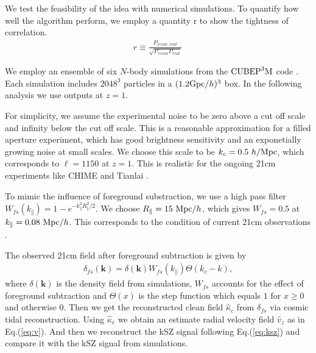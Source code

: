 We test the feasibility of the idea with numerical 
simulations. 
To quantify how well the algorithm perform, we employ a quantity r to show the tightness of correlation.
\begin{eqnarray}
	r\equiv \frac{P_{recon,real}}{\sqrt{P_{recon}P_{real}}}\,
\end{eqnarray}

We employ an ensemble of six $N$-body simulations from the
$\mathrm{CUBEP}^3\mathrm{M}$ code \cite{2013:code}. 
Each simulation includes $2048^3$ particles in a $(1.2\mathrm{Gpc}/h)^3$ box. 
In the following analysis we use outputs at $z=1$.

For simplicity, we assume the experimental
noise to be zero above a cut off scale and infinity below the cut off scale.
This is a reasonable approximation for a filled aperture experiment, which
has good brightness sensitivity and an exponetially growing noise at small 
scales.
We choose this scale to be $k_c=0.5\ h/\mr{Mpc}$, which corresponds
to $\ell=1150$ at $z=1$. This is realistic for the ongoing 21cm experiments like
CHIME \cite{2014SPIE.9145E..22B}\cite{2014SPIE.9145E..4VN}
and Tianlai \cite{2012IJMPS..12..256C}\cite{2015ApJ...798...40X}.

To mimic the influence of foreground substraction, we use a high pass filter 
$W_{fs}(k_\parallel)=1-e^{-k_\parallel^2R_\parallel^2/2}$. We choose 
$R_\parallel=15\ \mathrm{Mpc}/h$, which gives
$W_{fs}=0.5$ at
$k_\parallel=0.08\ \mathrm{Mpc}/h$.
This corresponds to the condition of current 21cm observations  
\cite{2013ApJ...763L..20M}\cite{2013MNRAS.434L..46S}.

The observed 21cm field after foreground subtraction is given by 
\begin{eqnarray}
\delta_{fs}(\bm{k})=\delta(\bm{k})W_{fs}(k_\parallel)\Theta(k_c-k),
\end{eqnarray}
where $\delta(\bm{k})$ is the density field from simulations, $W_{fs}$ accounts for 
the effect of foreground subtraction and $\Theta(x)$ is the step function 
which equals $1$ for $x\ge0$ and otherwise $0$.
Then we get the reconstructed clean field $\hat \kappa_c$ from $\delta_{fs}$ via
cosmic tidal reconstruction. 
Using $\hat \kappa_c$ we obtain an estimate radial velocity field $\hat v_z$ as in Eq.(\ref{eq:v}).
And then we reconstruct the kSZ signal following Eq.(\ref{eq:ksz}) and compare it with the kSZ signal from simulations.

